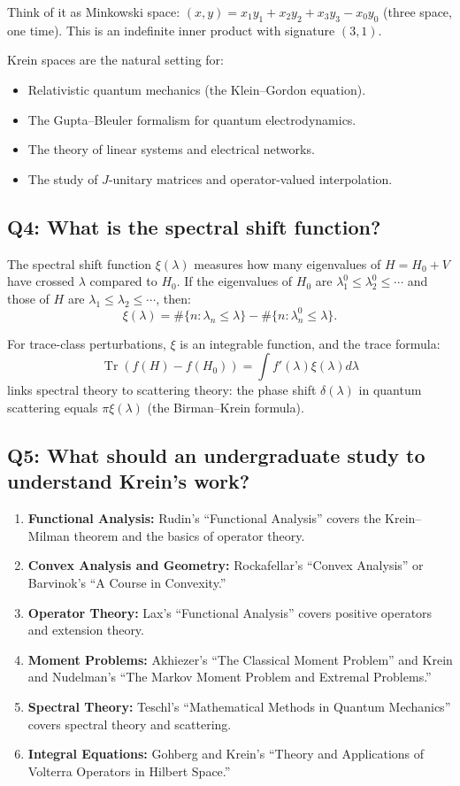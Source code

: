 Think of it as Minkowski space: $(x,y) = x_1y_1 + x_2y_2 + x_3y_3 - x_0y_0$ (three space, one time). This is an indefinite inner product with signature $(3,1)$.

Krein spaces are the natural setting for:
\begin{itemize}
    \item Relativistic quantum mechanics (the Klein--Gordon equation).
    \item The Gupta--Bleuler formalism for quantum electrodynamics.
    \item The theory of linear systems and electrical networks.
    \item The study of $J$-unitary matrices and operator-valued interpolation.
\end{itemize}

\subsection*{Q4: What is the spectral shift function?}

The spectral shift function $\xi(\lambda)$ measures how many eigenvalues of $H = H_0 + V$ have crossed $\lambda$ compared to $H_0$. If the eigenvalues of $H_0$ are $\lambda_1^0 \leq \lambda_2^0 \leq \cdots$ and those of $H$ are $\lambda_1 \leq \lambda_2 \leq \cdots$, then:
\[
\xi(\lambda) = \#\{n : \lambda_n \leq \lambda\} - \#\{n : \lambda_n^0 \leq \lambda\}.
\]

For trace-class perturbations, $\xi$ is an integrable function, and the trace formula:
\[
\operatorname{Tr}(f(H) - f(H_0)) = \int f'(\lambda) \xi(\lambda) d\lambda
\]
links spectral theory to scattering theory: the phase shift $\delta(\lambda)$ in quantum scattering equals $\pi \xi(\lambda)$ (the Birman--Krein formula).

\subsection*{Q5: What should an undergraduate study to understand Krein's work?}

\begin{enumerate}
    \item \textbf{Functional Analysis:} Rudin's ``Functional Analysis'' covers the Krein--Milman theorem and the basics of operator theory.
    \item \textbf{Convex Analysis and Geometry:} Rockafellar's ``Convex Analysis'' or Barvinok's ``A Course in Convexity.''
    \item \textbf{Operator Theory:} Lax's ``Functional Analysis'' covers positive operators and extension theory.
    \item \textbf{Moment Problems:} Akhiezer's ``The Classical Moment Problem'' and Krein and Nudelman's ``The Markov Moment Problem and Extremal Problems.''
    \item \textbf{Spectral Theory:} Teschl's ``Mathematical Methods in Quantum Mechanics'' covers spectral theory and scattering.
    \item \textbf{Integral Equations:} Gohberg and Krein's ``Theory and Applications of Volterra Operators in Hilbert Space.''
\end{enumerate}

